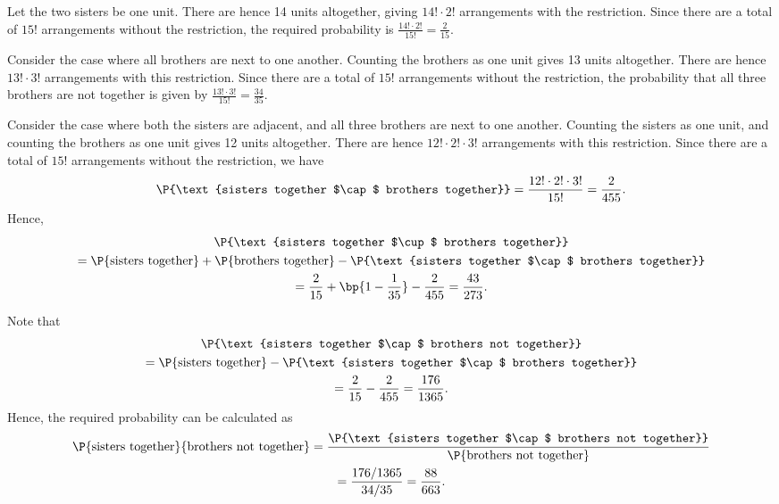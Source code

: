\begin{solution}
    \begin{ppart}
        Let the two sisters be one unit. There are hence 14 units altogether, giving $14! \cdot 2!$ arrangements with the restriction. Since there are a total of $15!$ arrangements without the restriction, the required probability is $\frac{14! \cdot 2!}{15!} = \frac{2}{15}$.
    \end{ppart}
    \begin{ppart}
        Consider the case where all brothers are next to one another. Counting the brothers as one unit gives 13 units altogether. There are hence $13! \cdot 3!$ arrangements with this restriction. Since there are a total of $15!$ arrangements without the restriction, the probability that all three brothers are not together is given by $\frac{13! \cdot 3!}{15!} = \frac{34}{35}$.
    \end{ppart}
    \begin{ppart}
        Consider the case where both the sisters are adjacent, and all three brothers are next to one another. Counting the sisters as one unit, and counting the brothers as one unit gives 12 units altogether. There are hence $12! \cdot 2! \cdot 3!$ arrangements with this restriction. Since there are a total of $15!$ arrangements without the restriction, we have \[\P{\text{sisters together $\cap$ brothers together}} = \frac{12! \cdot 2! \cdot 3!}{15!} = \frac2{455}.\]
        Hence,
        \begin{gather*}
            \P{\text{sisters together $\cup$ brothers together}} \\
            = \P{\text{sisters together}} + \P{\text{brothers together}} - \P{\text{sisters together $\cap$ brothers together}}\\
            = \frac2{15} + \bp{1 - \frac1{35}} - \frac2{455} = \frac{43}{273}.
        \end{gather*}
    \end{ppart}
    \begin{ppart}
        Note that
        \begin{gather*}
            \P{\text{sisters together $\cap$ brothers not together}} \\
            = \P{\text{sisters together}} - \P{\text{sisters together $\cap$ brothers together}}\\
            = \frac2{15} - \frac{2}{455} = \frac{176}{1365}.
        \end{gather*}
        Hence, the required probability can be calculated as
        \begin{gather*}
            \P{\text{sisters together}}{\text{brothers not together}} = \frac{\P{\text{sisters together $\cap$ brothers not together}}}{\P{\text{brothers not together}}}\\
            = \frac{176/1365}{34/35} = \frac{88}{663}.
        \end{gather*}
    \end{ppart}
\end{solution}